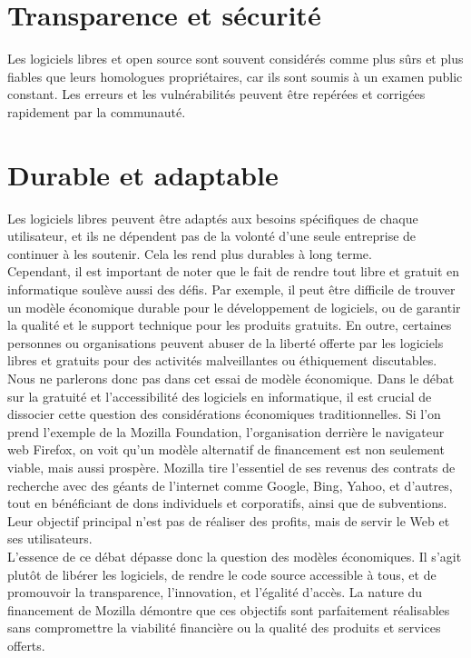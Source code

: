     \section{Transparence et sécurité} Les logiciels libres et open source sont souvent considérés comme plus sûrs et plus fiables que leurs homologues propriétaires, car ils sont soumis à un examen public constant. Les erreurs et les vulnérabilités peuvent être repérées et corrigées rapidement par la communauté.

    \section{Durable et adaptable}  Les logiciels libres peuvent être adaptés aux besoins spécifiques de chaque utilisateur, et ils ne dépendent pas de la volonté d'une seule entreprise de continuer à les soutenir. Cela les rend plus durables à long terme.\\


Cependant, il est important de noter que le fait de rendre tout libre et gratuit en informatique soulève aussi des défis. Par exemple, il peut être difficile de trouver un modèle économique durable pour le développement de logiciels, ou de garantir la qualité et le support technique pour les produits gratuits. En outre, certaines personnes ou organisations peuvent abuser de la liberté offerte par les logiciels libres et gratuits pour des activités malveillantes ou éthiquement discutables.\\
Nous ne parlerons donc pas dans cet essai de modèle économique. Dans le débat sur la gratuité et l'accessibilité des logiciels en informatique, il est crucial de dissocier cette question des considérations économiques traditionnelles. Si l'on prend l'exemple de la Mozilla Foundation, l'organisation derrière le navigateur web Firefox, on voit qu'un modèle alternatif de financement est non seulement viable, mais aussi prospère. Mozilla tire l'essentiel de ses revenus des contrats de recherche avec des géants de l'internet comme Google, Bing, Yahoo, et d'autres, tout en bénéficiant de dons individuels et corporatifs, ainsi que de subventions. Leur objectif principal n'est pas de réaliser des profits, mais de servir le Web et ses utilisateurs.\\

L'essence de ce débat dépasse donc la question des modèles économiques. Il s'agit plutôt de libérer les logiciels, de rendre le code source accessible à tous, et de promouvoir la transparence, l'innovation, et l'égalité d'accès. La nature du financement de Mozilla démontre que ces objectifs sont parfaitement réalisables sans compromettre la viabilité financière ou la qualité des produits et services offerts.
